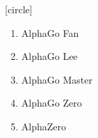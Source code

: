 \documentclass{beamer}
\begin{document}
  {
    [circle]{\color{white}}
    \begin{frame}[standout]
      \pause
      \begin{enumerate}[<+- | alert@+>]
        \item AlphaGo Fan
        \item AlphaGo Lee
        \item AlphaGo Master
        \item AlphaGo Zero
        \item AlphaZero
      \end{enumerate}
    \end{frame}
  }

\end{document}
